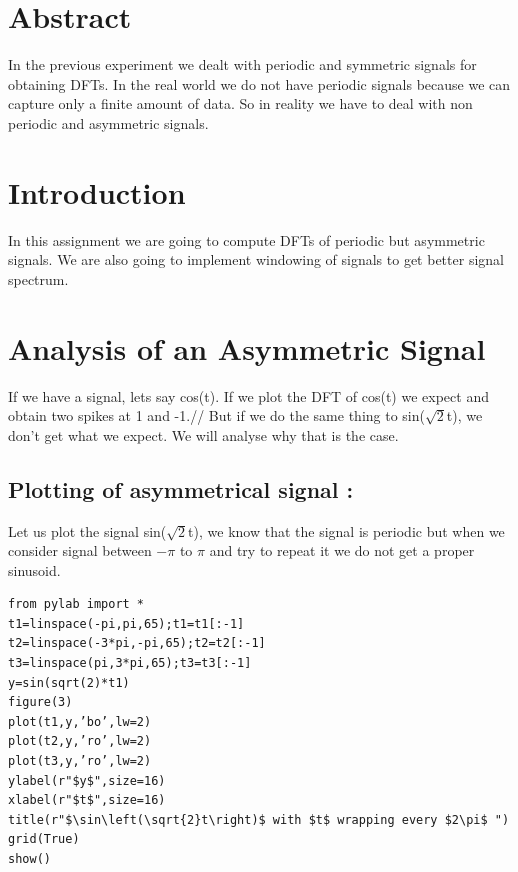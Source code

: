 \documentclass[10pt,english, openany]{book}
\begin{document}
\mainmatter

\chapter{Abstract}
In the previous experiment we dealt with periodic and symmetric signals for obtaining DFTs. In the real world we do not have periodic signals because we can capture only a finite amount of data. So in reality we have to deal with non periodic and asymmetric signals.
\par 
\begingroup
\let\clearpage\relax

\chapter{Introduction}

In this assignment we are going to compute DFTs of periodic but asymmetric signals. We are also going to implement windowing of signals to get better signal spectrum.

\endgroup

\chapter{Analysis of an Asymmetric Signal}

If we have a signal, lets say cos(t). If we plot the DFT of cos(t) we expect
and obtain two spikes at 1 and -1.//
But if we do the same thing to sin($\sqrt{2}$t), we don’t get what we expect. We will analyse why that is the case.

\section{Plotting of asymmetrical signal :}
Let us plot the signal sin($\sqrt{2}$t), we know that the signal is periodic but when we consider signal between $-\pi$ to $\pi$ and try to repeat it we do not get a proper sinusoid.\\

\begin{verbatim}
from pylab import * 
t1=linspace(-pi,pi,65);t1=t1[:-1] 
t2=linspace(-3*pi,-pi,65);t2=t2[:-1]
t3=linspace(pi,3*pi,65);t3=t3[:-1] 
y=sin(sqrt(2)*t1)
figure(3)
plot(t1,y,’bo’,lw=2)
plot(t2,y,’ro’,lw=2)
plot(t3,y,’ro’,lw=2)
ylabel(r"$y$",size=16)
xlabel(r"$t$",size=16)
title(r"$\sin\left(\sqrt{2}t\right)$ with $t$ wrapping every $2\pi$ ")
grid(True)
show()
\end{verbatim}
\end{document}
